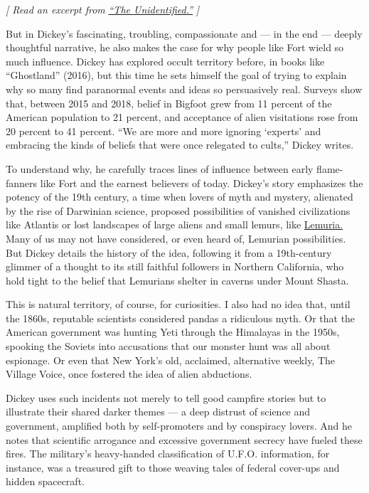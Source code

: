 \emph{{[} Read an excerpt from}
\href{https://www.nytimes3xbfgragh.onion/2020/07/22/books/review/the-unidentified-by-colin-dickey-an-excerpt.html}{\emph{``The
Unidentified.''}} \emph{{]}}

But in Dickey's fascinating, troubling, compassionate and --- in the end
--- deeply thoughtful narrative, he also makes the case for why people
like Fort wield so much influence. Dickey has explored occult territory
before, in books like ``Ghostland'' (2016), but this time he sets
himself the goal of trying to explain why so many find paranormal events
and ideas so persuasively real. Surveys show that, between 2015 and
2018, belief in Bigfoot grew from 11 percent of the American population
to 21 percent, and acceptance of alien visitations rose from 20 percent
to 41 percent. ``We are more and more ignoring `experts' and embracing
the kinds of beliefs that were once relegated to cults,'' Dickey writes.

To understand why, he carefully traces lines of influence between early
flame-fanners like Fort and the earnest believers of today. Dickey's
story emphasizes the potency of the 19th century, a time when lovers of
myth and mystery, alienated by the rise of Darwinian science, proposed
possibilities of vanished civilizations like Atlantis or lost landscapes
of large aliens and small lemurs, like
\href{https://blogs.scientificamerican.com/history-of-geology/a-geologists-dream-the-lost-continent-of-lemuria/}{Lemuria.}
Many of us may not have considered, or even heard of, Lemurian
possibilities. But Dickey details the history of the idea, following it
from a 19th-century glimmer of a thought to its still faithful followers
in Northern California, who hold tight to the belief that Lemurians
shelter in caverns under Mount Shasta.

This is natural territory, of course, for curiosities. I also had no
idea that, until the 1860s, reputable scientists considered pandas a
ridiculous myth. Or that the American government was hunting Yeti
through the Himalayas in the 1950s, spooking the Soviets into
accusations that our monster hunt was all about espionage. Or even that
New York's old, acclaimed, alternative weekly, The Village Voice, once
fostered the idea of alien abductions.

Dickey uses such incidents not merely to tell good campfire stories but
to illustrate their shared darker themes --- a deep distrust of science
and government, amplified both by self-promoters and by conspiracy
lovers. And he notes that scientific arrogance and excessive government
secrecy have fueled these fires. The military's heavy-handed
classification of U.F.O. information, for instance, was a treasured gift
to those weaving tales of federal cover-ups and hidden spacecraft.

